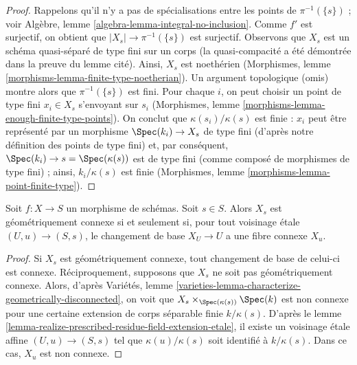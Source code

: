 \begin{proof}
Rappelons qu'il n'y a pas de spécialisations entre les points de $\pi^{-1}(\{s\})$ ;
voir Algèbre, lemme \ref{algebra-lemma-integral-no-inclusion}.
Comme $f'$ est surjectif, on obtient que $|X_s| \to \pi^{-1}(\{s\})$ est surjectif.
Observons que $X_s$ est un schéma quasi-séparé de type fini
sur un corps (la quasi-compacité a été démontrée dans la preuve du
lemme cité). Ainsi, $X_s$ est noethérien
(Morphismes, lemme \ref{morphisms-lemma-finite-type-noetherian}).
Un argument topologique (omis) montre alors que $\pi^{-1}(\{s\})$ est fini.
Pour chaque $i$, on peut choisir un point de type fini $x_i \in X_s$ s'envoyant sur $s_i$
(Morphismes, lemme \ref{morphisms-lemma-enough-finite-type-points}).
On conclut que $\kappa(s_i)/\kappa(s)$ est finie :
$x_i$ peut être représenté par un morphisme $\Spec(k_i) \to X_s$
de type fini (d'après notre définition des points de type fini)
et, par conséquent, $\Spec(k_i) \to s = \Spec(\kappa(s))$ est de type fini
(comme composé de morphismes de type fini) ;
ainsi, $k_i/\kappa(s)$ est finie (Morphismes, lemme
\ref{morphisms-lemma-point-finite-type}).
\end{proof}

\begin{lemma}
\label{lemma-characterize-geometrically-connected-fibres}
Soit $f : X \to S$ un morphisme de schémas.
Soit $s \in S$. Alors $X_s$ est géométriquement connexe si et
seulement si, pour tout voisinage \'etale $(U, u) \to (S, s)$,
le changement de base $X_U \to U$ a une fibre connexe $X_u$.
\end{lemma}

\begin{proof}
Si $X_s$ est géométriquement connexe, tout changement de base de celui-ci est connexe.
Réciproquement, supposons que $X_s$ ne soit pas géométriquement connexe.
Alors, d'après
Variétés, lemme
\ref{varieties-lemma-characterize-geometrically-disconnected},
on voit que $X_s \times_{\Spec(\kappa(s))} \Spec(k)$ est
non connexe pour une certaine
extension de corps séparable finie $k/\kappa(s)$. D'après
le lemme \ref{lemma-realize-prescribed-residue-field-extension-etale},
il existe un voisinage \'etale affine $(U, u) \to (S, s)$ tel que
$\kappa(u)/\kappa(s)$ soit identifié à $k/\kappa(s)$.
Dans ce cas, $X_u$ est non connexe.
\end{proof}

